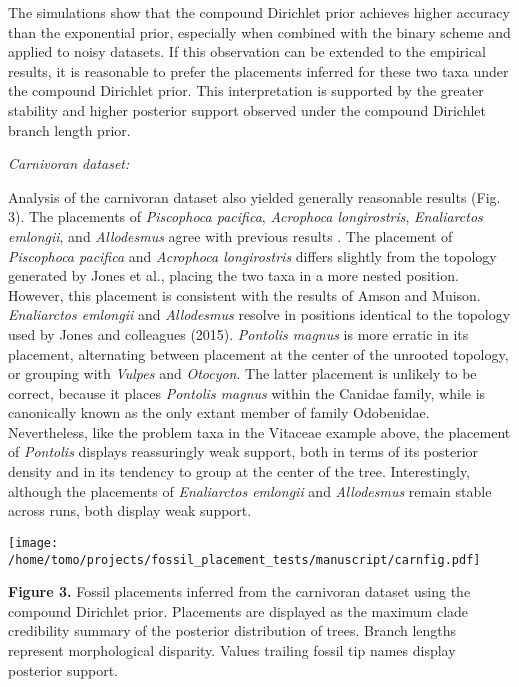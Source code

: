 \documentclass[12pt]{article}
\begin{document}
The simulations show that the compound Dirichlet prior
achieves higher accuracy than the exponential prior, especially when 
combined with the binary scheme and applied to noisy
datasets. If this observation can be extended 
to the empirical results, it is reasonable to prefer the placements inferred 
for these two taxa under the compound Dirichlet prior. This interpretation is supported
by the greater stability and higher posterior support observed under the compound 
Dirichlet branch length prior.

\noindent\emph{Carnivoran dataset:}

Analysis of the carnivoran dataset also yielded generally reasonable
results (Fig. 3). The placements of \emph{Piscophoca pacifica}, \emph{Acrophoca
longirostris}, \emph{Enaliarctos emlongii}, and \emph{Allodesmus} agree
with previous results \citep{amson2014,jones2015impact}. The
placement of \emph{Piscophoca pacifica} and \emph{Acrophoca
longirostris} differs slightly from the topology generated by Jones et al.,
placing the two taxa in a more nested position. However, this placement
is consistent with the results of Amson and Muison. \emph{Enaliarctos
emlongii} and \emph{Allodesmus} resolve in positions identical to the
topology used by Jones and colleagues (2015). \emph{Pontolis magnus} is more
erratic in its placement, alternating between placement at the center of
the unrooted topology, or grouping  with \emph{Vulpes} and
\emph{Otocyon}. The latter placement is unlikely to be correct, because it places
\emph{Pontolis magnus} within the Canidae family, while
 is canonically known as the only extant member of family Odobenidae. 
 Nevertheless, like the problem taxa in the Vitaceae
example above, the placement of \emph{Pontolis} displays reassuringly
weak support, both in terms of its posterior density and in its tendency
to group at the center of the tree. Interestingly, although the
placements of \emph{Enaliarctos emlongii} and \emph{Allodesmus} remain
stable across runs, both display weak support.

\texttt{[image: /home/tomo/projects/fossil\_placement\_tests/manuscript/carnfig.pdf]}

\textbf{Figure 3.} Fossil placements inferred from the carnivoran
dataset using the compound Dirichlet prior. Placements are displayed as
the maximum clade credibility summary of the posterior distribution of
trees. Branch lengths represent morphological disparity. Values trailing
fossil tip names display posterior support.
\end{document}
